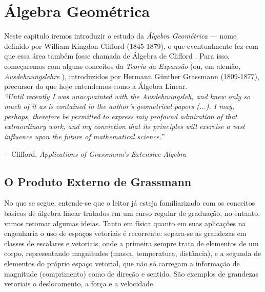\documentclass[a4paper,12pt]{report}
\makeatletter
\theoremstyle{plain}
\theoremstyle{definition}
\newenvironment{chapquote}[2][2em]
{\setlength{\@tempdima}{#1}%
	\def\chapquote@author{#2}%
	\parshape 1 \@tempdima \dimexpr\textwidth-2\@tempdima\relax%
	\itshape}
{\par\normalfont\hfill--\ \chapquote@author\hspace*{\@tempdima}\par\bigskip}
\makeatother
\begin{document}
\section{Álgebra Geométrica}

Neste capitulo iremos introduzir o estudo da \textit{Álgebra Geométrica} --- nome definido por William Kingdon Clifford (1845-1879), o que eventualmente fez com que essa área também fosse chamada de Álgebra de Clifford \cite{sommerGeometric}. Para isso, começaremos com alguns conceitos da \textit{Teoria da Expansão} (ou, em alemão, \textit{Ausdehnungslehre} \cite{grassmannLineale}), introduzidos por Hermann Günther Grassmann (1809-1877), precursor do que hoje entendemos como a Álgebra Linear. 
\\


\begin{chapquote}{Clifford, \textit{Applications of Grassmann's Extensive Algebra} \cite{cliffordApplicationsGrassmannAlgebras}}
	``Until recently I was unacquainted with the Ausdehnungsleh, and knew only so much of it as is contained in the author's geometrical papers (...). I may, perhaps, therefore be permitted to express miy profound admiration of that extraordinary work, and my conviction that its principles will exercise a vast influence upon the future of mathematical science.''
\end{chapquote}

\subsection{O Produto Externo de Grassmann}

No que se segue, entende-se que o leitor já esteja familiarizado com os conceitos básicos de álgebra linear tratados em um curso regular de graduação, no entanto, vamos retomar algumas ideias. 
Tanto em física quanto em suas aplicações na engenharia o uso de espaços vetoriais é recorrente: separa-se as grandezas em classes de escalares e vetoriais, onde a primeira sempre trata de elementos de um corpo, representando magnitudes (massa, temperatura, distância), e a segunda de elementos do próprio espaço vetorial, que não só carregam a informação de magnitude (comprimento) como de direção e sentido. São exemplos de grandezas vetoriais o deslocamento, a força e a velocidade.
\end{document}

